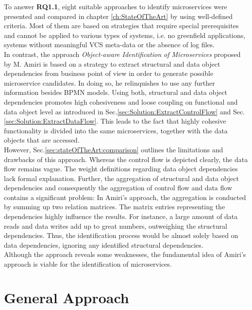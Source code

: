 To answer \textbf{RQ1.1}, eight suitable approaches to identify microservices were presented and compared in chapter \ref{ch:StateOfTheArt} by using well-defined criteria. Most of them are based on strategies that require special prerequisites and cannot be applied to various types of systems, i.e. no greenfield applications, systems without meaningful VCS meta-data or the absence of log files. \\
In contrast, the approach \textit{Object-aware Identification of Microservices} proposed by M. Amiri is based on a strategy to extract structural and data object dependencies from business point of view in order to generate possible microservice candidates\cite{ObjectAwareAmiri}. In doing so, he relinquishes to use any further information besides BPMN models. Using both, structural and data object dependencies promotes high cohesiveness and loose coupling on functional and data object level as introduced in Sec.\ref{sec:Solution:ExtractControlFlow} and Sec.\ref{sec:Solution:ExtractDataFlow}. This leads to the fact that highly cohesive functionality is divided into the same microservices, together with the data objects that are accessed.  \\
However, Sec.\ref{sec:stateOfTheArt:comparison} outlines the limitations and drawbacks of this approach. Whereas the control flow is depicted clearly, the data flow remains vague. The weight definitions regarding data object dependencies lack formal explanation. Further, the aggregation of structural and data object dependencies and consequently the aggregation of control flow and data flow contains a significant problem: In Amiri's approach, the aggregation is conducted by summing up two relation matrices. The matrix entries representing the dependencies highly influence the results. For instance, a large amount of data reads and data writes add up to great numbers, outweighing the structural dependencies. Thus, the identification process would be almost solely based on data dependencies, ignoring any identified structural dependencies. \\
Although the approach reveals some weaknesses, the fundamental idea of Amiri's approach is viable for the identification of microservices\cite{ObjectAwareAmiri}.








\section{General Approach}



